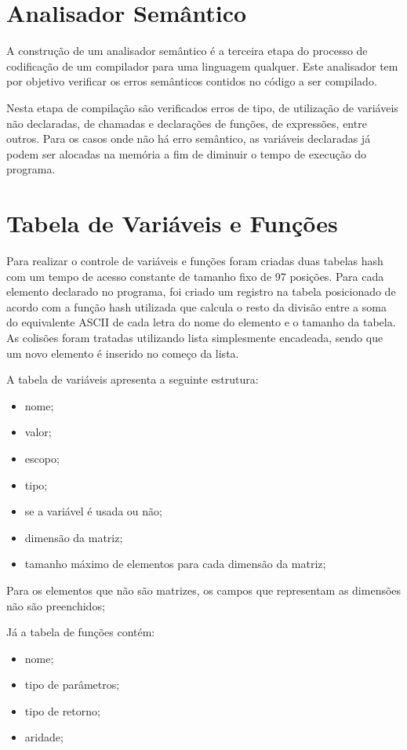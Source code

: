 \documentclass[
12pt,				%
a4paper,			%
english,			%
french,				%
spanish,			%
brazil,				%
article
]{abntex2}
\begin{document}
\section{Analisador Semântico}

A construção de um analisador semântico é a terceira etapa do processo de codificação de um compilador para uma linguagem qualquer. Este analisador tem por objetivo verificar os erros semânticos contidos no código a ser compilado. 

Nesta etapa de compilação são verificados erros de tipo, de utilização de variáveis não declaradas, de chamadas e declarações de funções, de expressões, entre outros. Para os casos onde não há erro semântico, as variáveis declaradas já podem ser alocadas na memória a fim de diminuir o tempo de execução do programa.  

\section{Tabela de Variáveis e Funções}

Para realizar o controle de variáveis e funções foram criadas duas tabelas hash com um tempo de acesso constante de tamanho fixo de 97 posições. Para cada elemento declarado no programa, foi criado um registro na tabela posicionado de acordo com a função hash utilizada que calcula o resto da divisão entre a soma do equivalente ASCII de cada letra do nome do elemento e o tamanho da tabela. As colisões foram tratadas utilizando lista simplesmente encadeada, sendo que um novo elemento é inserido no começo da lista.

A tabela de variáveis apresenta a seguinte estrutura:

\begin{itemize}
	\item nome;
	\item valor;
	\item escopo;
	\item tipo;
	\item se a variável é usada ou não;
	\item dimensão da matriz;
	\item tamanho máximo de elementos para cada dimensão da matriz; 
\end{itemize}

Para os elementos que não são matrizes, os campos que representam as dimensões não são preenchidos;

Já a tabela de funções contém:

\begin{itemize}
	\item nome;
	\item tipo de parâmetros;
	\item tipo de retorno;
	\item aridade;
\end{itemize}
\end{document}

